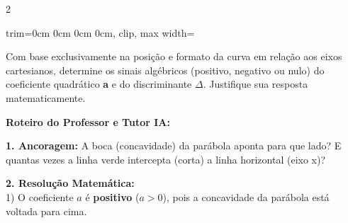 \begin{multicols*}{2}
\begin{enunciadoLiteral}
\begin{center}
\begin{adjustbox}{trim=0cm 0cm 0cm 0cm, clip, max width=\larguraTikz}
\end{adjustbox}
\end{center}

Com base exclusivamente na posição e formato da curva em relação aos eixos cartesianos, determine os sinais algébricos (positivo, negativo ou nulo) do coeficiente quadrático \textbf{a} e do discriminante $\Delta$. Justifique sua resposta matematicamente.
\end{enunciadoLiteral}

\ifgabarito
    \begin{tcolorbox}[colback=CorTitUm!5, colframe=CorTitUm, boxrule=1pt, arc=4pt, left=6pt, right=6pt, top=6pt, bottom=6pt]
    \small\textbf{\textcolor{CorTitUm}{Roteiro do Professor e Tutor IA:}}\par\vspace{0.1cm}
    \color{CinzaEscuro}
    \textbf{1. Ancoragem:} A boca (concavidade) da parábola aponta para que lado? E quantas vezes a linha verde intercepta (corta) a linha horizontal (eixo x)?\par\vspace{0.1cm}
    \textbf{2. Resolução Matemática:}\\
    1) O coeficiente $a$ é \textbf{positivo} ($a > 0$), pois a concavidade da parábola está voltada para cima.
    

\end{tcolorbox}
\end{multicols*}
